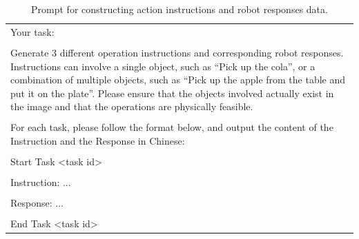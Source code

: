 \begin{table}[h!]
\begin{minipage}{0.99\columnwidth}
\begin{tcolorbox}
\begin{tabular}{p{}}
\\
Your task: \\
\\
Generate 3 different operation instructions and corresponding robot responses. Instructions can involve a single object, such as ``Pick up the cola'', or a combination of multiple objects, such as ``Pick up the apple from the table and put it on the plate''. Please ensure that the objects involved actually exist in the image and that the operations are physically feasible. \\
\\
For each task, please follow the format below, and output the content of the Instruction and the Response in Chinese: \\
\\
Start Task \textless task id\textgreater \\
\\
Instruction: ... \\
\\
Response: ... \\
\\
End Task \textless task id\textgreater
    \end{tabular}
\end{tcolorbox}
\vspace{-2mm}
\caption{Prompt for constructing action instructions and robot responses data.}
    \label{tab:prompt1}
\end{minipage}
\end{table}

